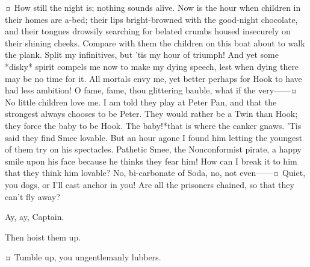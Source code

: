 \begin{drama}

\hookspeaks {}¤
How still the night is; nothing sounds alive.
Now is the hour when children in their homes are a-bed;
their lips bright-browned with the good-night chocolate,
and their tongues drowsily searching for belated crumbs housed insecurely on their shining cheeks.
Compare with them the children on this boat about to walk the plank.
Split my infinitives, but 'tis my hour of triumph!
And yet some *disky* spirit compels me now to make my dying speech, lest when dying there may be no time for it.
All mortals envy me, yet better perhaps for Hook to have had less ambition!
O fame, fame, thou glittering bauble, what if the very——¤
No little children love me.
I am told they play at Peter Pan, and that the strongest always chooses to be Peter.
They would rather be a Twin than Hook; they force the baby to be Hook.
The baby!\@ *that is where the canker gnaws.
'Tis said they find Smee lovable.
But an hour agone I found him letting the youngest of them try on his spectacles.
Pathetic Smee, the Nonconformist pirate, a happy smile upon his face because he thinks they fear him!
How can I break it to him that they think him lovable?
No, bi-carbonate of Soda, no, not even——¤
Quiet, you dogs, or I'll cast anchor in you!
Are all the prisoners chained, so that they can't fly away?

\jukesspeaks
Ay, ay, Captain.

\hookspeaks
Then hoist them up.

\starkeyspeaks {}¤
Tumble up, you ungentlemanly lubbers.



\end{drama}
